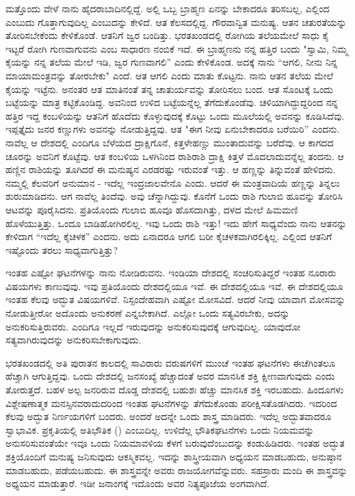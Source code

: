 ಮತ್ತೊಂದು ವೇಳೆ ನಾನು ಹೈದರಾಬಾದಿನಲ್ಲಿದ್ದೆ. ಅಲ್ಲಿ ಒಬ್ಬ ಬ್ರಾಹ್ಮಣ ಏನನ್ನು ಬೇಕಾದರೂ ತರಿಸಬಲ್ಲ, ಎಲ್ಲಿಂದ ಎಂಬುದು ಗೊತ್ತಾಗುವುದಿಲ್ಲ ಎಂಬುದನ್ನು ಕೇಳಿದೆ. ಆತ ಕೆಲಸದಲ್ಲಿದ್ದ. ಗೌರವಾನ್ವಿತ ಮನುಷ್ಯ. ಆತನ ಚತುರತೆಯನ್ನು ತೋರಿಸಬೇಕೆಂದು ಕೇಳಿಕೊಂಡೆ. ಆತನಿಗೆ ಜ್ವರ ಬಂದಿತ್ತು. ಭರತಖಂಡದಲ್ಲಿ ರೋಗಿಯ ತಲೆಯಮೇಲೆ ಸಾಧು ಕೈ ಇಟ್ಟರೆ ರೋಗಿ ಗುಣವಾಗುವನು ಎಂಬ ಸಾಧಾರಣ ನಂಬಿಕೆ ಇದೆ. ಈ ಬ್ರಾಹ್ಮಣನು ನನ್ನ ಹತ್ತಿರ ಬಂದು "ಸ್ವಾಮಿ, ನಿಮ್ಮ ಕೈಯನ್ನು ನನ್ನ ತಲೆಯ ಮೇಲೆ ಇಡಿ, ಜ್ವರ ಗುಣವಾಗಲಿ'' ಎಂದು ಕೇಳಿಕೊಂಡ. ಅದಕ್ಕೆ ನಾನು “ಆಗಲಿ, ನೀನು ನಿನ್ನ ಮಾಯಾಮಂತ್ರವನ್ನು ತೋರಬೇಕು" ಎಂದೆ. ಆತ ಆಗಲಿ ಎಂದು ಮಾತು ಕೊಟ್ಟನು. ನಾನು ಆತನ ತಲೆಯ ಮೇಲೆ ಕೈಯನ್ನು ಇಟ್ಟೆನು. ಅನಂತರ ಆತ ಮಾತಿನಂತೆ ತನ್ನ ಚಾತುರ್ಯವನ್ನು ತೋರಿಸಲು ಬಂದ. ಆತ ಸೊಂಟಕ್ಕೆ ಒಂದು ಬಟ್ಟೆಯನ್ನು ಮಾತ್ರ ಕಟ್ಟಿಕೊಂಡಿದ್ದ. ಅವನಿಂದ ಉಳಿದ ಬಟ್ಟೆಯನ್ನೆಲ್ಲ ತೆಗೆದುಕೊಂಡೆವು. ಚಳಿಯಾಗಿದ್ದುದ್ದರಿಂದ ನನ್ನ ಹತ್ತಿರ ಇದ್ದ ಕಂಬಳಿಯನ್ನು ಆತನಿಗೆ ಹೊದೆದು ಕೊಳ್ಳುವುದಕ್ಕೆ ಕೊಟ್ಟು ಒಂದು ಮೂಲೆಯಲ್ಲಿ ಅವನನ್ನು ಕೂಡಿಸಿದೆವು. ಇಪ್ಪತ್ತೈದು ಜನರ ಕಣ್ಣುಗಳು ಅವನನ್ನು ನೋಡುತ್ತಿದ್ದವು. ಆತ "ಈಗ ನೀವು ಏನುಬೇಕಾದರೂ ಬರೆಯಿರಿ'' ಎಂದನು. ನಾವೆಲ್ಲ ಆ ದೇಶದಲ್ಲಿ ಎಂದಿಗೂ ಬೆಳೆಯದ ದ್ರಾಕ್ಷಿಗೊನೆ, ಕಿತ್ತಳೇಹಣ್ಣು ಮುಂತಾದುವನ್ನು ಬರೆದೆವು. ಆ ಕಾಗದದ ಚೂರನ್ನು ಅವನಿಗೆ ಕೊಟ್ಟೆವು. ಆತ ಕಂಬಳಿಯ ಒಳಗಿನಿಂದ ರಾಶಿರಾಶಿ ದ್ರಾಕ್ಷಿ ಕಿತ್ತಳೆ ಮೊದಲಾದುವನ್ನೆಲ್ಲ ತಂದನು. ಆ ಹಣ್ಣಿನ ರಾಶಿಯನ್ನು ತೂಗಿದರೆ ಈ ಮನುಷ್ಯನ ಎರಡರಷ್ಟು ಇರುವಂತೆ ಇತ್ತು. ಆ ಹಣ್ಣನ್ನು ತಿನ್ನುವಂತೆ ಹೇಳಿದನು. ನಮ್ಮಲ್ಲಿ ಕೆಲವರಿಗೆ ಅನುಮಾನ - ಇದೆಲ್ಲ ಇಂದ್ರಜಾಲವೇನೊ ಎಂದು. ಆದರೆ ಈ ಮಂತ್ರವಾದಿಯೆ ಹಣ್ಣನ್ನು ತಿನ್ನಲು ಶುರುಮಾಡಿದನು. ಆಗ ನಾವೆಲ್ಲ ತಿಂದೆವು. ಅವು ಚೆನ್ನಾಗಿದ್ದುವು. ಕೊನೆಗೆ ಒಂದು ರಾಶಿ ಗುಲಾಬಿ ಹೂವನ್ನು ತೋರಿಸಿ ಆಟವನ್ನು ಪೂರೈಸಿದನು. ಪ್ರತಿಯೊಂದು ಗುಲಾಬಿ ಹೂವೂ ಹೊಸದಾಗಿತ್ತು, ದಳದ ಮೇಲೆ ಹಿಮಮಣಿ ಹೊಳೆಯುತ್ತಿತ್ತು. ಒಂದೂ ಬಾಡಿಹೋಗಿರಲಿಲ್ಲ. ಇವು ಒಂದು ರಾಶಿ ಇತ್ತು! ಇದು ಹೇಗೆ ಸಾಧ್ಯವೆಂದು ನಾನು ಆತನನ್ನು ಕೇಳಿದಾಗ “ಇದೆಲ್ಲ ಕೈಚಳಕ'' ಎಂದನು. ಅದು ಏನಾದರೂ ಆಗಲಿ ಬರೀ ಕೈಚಳಕವಾಗಿರಲಿಕ್ಕಿಲ್ಲ. ಎಲ್ಲಿಂದ ಆತನಿಗೆ ಇಷ್ಟೊಂದು ತರಲು ಸಾಧ್ಯವಾಗುತ್ತಿತ್ತು?

ಇಂತಹ ಎಷ್ಟೋ ಘಟನೆಗಳನ್ನು ನಾನು ನೋಡಿರುವನು. ಇಂಡಿಯಾ ದೇಶದಲ್ಲಿ ಸಂಚರಿಸುತಿದ್ದರೆ ಇಂತಹ ನೂರಾರು ವಿಷಯಗಳು ಕಾಣುವುವು. ಇವು ಪ್ರತಿಯೊಂದು ದೇಶದಲ್ಲಿಯೂ ಇವೆ. ಈ ದೇಶದಲ್ಲಿಯೂ ಇವೆ. ಈ ದೇಶದಲ್ಲಿಯೂ ಇಂತಹ ಕೆಲವು ಅದ್ಭುತ ವಿಷಯಗಳಿವೆ. ನಿಸ್ಸಂದೇಹವಾಗಿ ಎಷ್ಟೋ ಮೋಸವಿದೆ. ಆದರೆ ನೀವು ಯಾವಾಗ ಮೋಸವನ್ನು ನೋಡುತ್ತೀರೋ ಅದೊಂದು ಅನುಕರಣೆ ಎನ್ನಬೇಕಾಗಿದೆ. ಎಲ್ಲೋ ಒಂದು ಸತ್ಯವಿರಬೇಕು, ಅದನ್ನು ಅನುಕರಿಸುತ್ತಿರುವರು. ಎಂದಿಗೂ ಇಲ್ಲದೆ ಇರುವುದನ್ನು ಅನುಕರಿಸುವುದಕ್ಕೆ ಆಗುವುದಿಲ್ಲ. ಯಾವುದೋ ಸತ್ಯವಾಗಿರುವುದನ್ನು ಅನುಕರಿಸಬೇಕಾಗುವುದು.

ಭರತಖಂಡದಲ್ಲಿ ಅತಿ ಪುರಾತನ ಕಾಲದಲ್ಲಿ ಸಾವಿರಾರು ವರುಷಗಳಿಗೆ ಮುಂಚೆ ಇಂತಹ ಘಟನೆಗಳು ಈಚೆಗಿಂತಲೂ ಹೆಚ್ಚಾಗಿ ಆಗುತ್ತಿದ್ದವು. ಒಂದು ದೇಶದಲ್ಲಿ ಜನಸಂಖ್ಯೆ ಹೆಚ್ಚಾದಂತೆ ಅವರ ಮಾನಸಿಕ ಶಕ್ತಿ ಕ್ಷೀಣವಾಗುವುದು ಎಂದು ತೋರುತ್ತದೆ. ಬಹಳ ಅಲ್ಪ ಜನರಿರುವ ದೊಡ್ಡ ದೇಶದಲ್ಲಿ ಬಹುಶಃ ಹೆಚ್ಚು ಮಾನಸಿಕ ಶಕ್ತಿ ಇರಬಹುದು. ಹಿಂದೂಗಳು ವಿಶ್ಲೇಷಣಾತ್ಮಕ ಮನಸ್ಸಿನವರಾದುದರಿಂದ ಇಂತಹ ಘಟನೆಗಳನ್ನು ತೆಗೆದುಕೊಂಡು ಪರೀಕ್ಷಿಸತೊಡಗಿದರು. ಇದರಿಂದ ಕೆಲವು ಅದ್ಭುತ ನಿರ್ಣಯಗಳಿಗೆ ಬಂದರು. ಅಂದರೆ ಅದನ್ನೇ ಒಂದು ಶಾಸ್ತ್ರ ಮಾಡಿದರು. ಇದೆಲ್ಲ ಅದ್ಭುತವಾದರೂ ಸ್ವಾಭಾವಿಕ. ಪ್ರಕೃತಿಯಲ್ಲಿ ಅತಿಭೌತಿಕ () ಎಂಬುದಿಲ್ಲ. ಉಳಿದೆಲ್ಲ ಭೌತಿಕಘಟನೆಗಳು ಒಂದು ನಿಯಮವನ್ನು ಅನುಸರಿಸುವಂತೆಯೇ ಇವೂ ಒಂದು ನಿಯಮಾವಳಿಯ ಕೆಳಗೆ ಬರುವುದೆಂಬುದನ್ನು ಕಂಡುಹಿಡಿದರು. ಇಂತಹ ಅದ್ಭುತ ಶಕ್ತಿಯೊಂದಿಗೆ ಮನುಷ್ಯ ಜನಿಸುವುದು ಆಕಸ್ಮಿಕವಲ್ಲ. ಇದನ್ನು ಶಾಸ್ತ್ರೀಯವಾಗಿ ಅಧ್ಯಯನ ಮಾಡಬಹುದು, ಅನುಷ್ಠಾನ ಮಾಡಬಹುದು, ಪಡೆಯಬಹುದು. ಈ ಶಾಸ್ತ್ರವನ್ನೇ ಅವರು ರಾಜಯೋಗವೆನ್ನುವರು. ಸಹಸ್ರಾರು ಮಂದಿ ಈ ಶಾಸ್ತ್ರವನ್ನು ಅಧ್ಯಯನ ಮಾಡುತ್ತಾರೆ. ಇಡೀ ಜನಾಂಗಕ್ಕೆ ಇದೊಂದು ಅವರ ನಿತ್ಯಪೂಜೆಯ ಅಂಗವಾಗಿದೆ.

